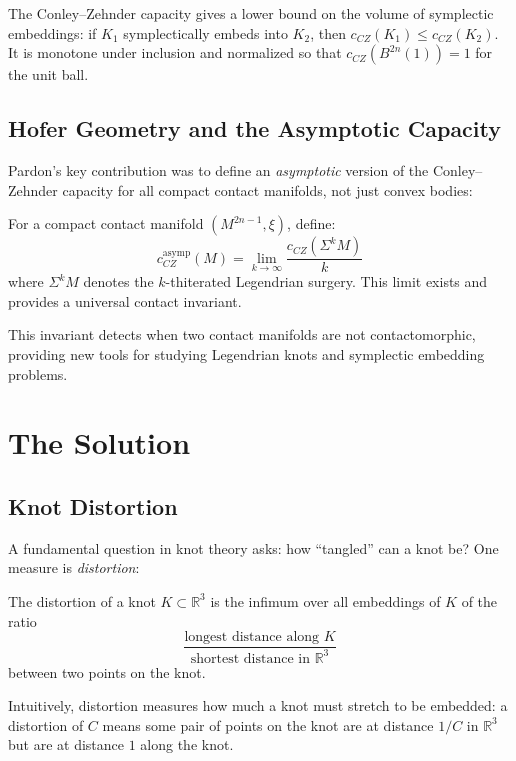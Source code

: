 The Conley--Zehnder capacity gives a lower bound on the volume of symplectic embeddings: if $K_1$ symplectically embeds into $K_2$, then $c_{CZ}(K_1) \le c_{CZ}(K_2)$. It is monotone under inclusion and normalized so that $c_{CZ}(B^{2n}(1)) = 1$ for the unit ball.

\subsection{Hofer Geometry and the Asymptotic Capacity}

Pardon's key contribution was to define an \emph{asymptotic} version of the Conley--Zehnder capacity for all compact contact manifolds, not just convex bodies:

\begin{theorem}
For a compact contact manifold $(M^{2n-1}, \xi)$, define:
\[
c_{CZ}^{\text{asymp}}(M) = \lim_{k \to \infty} \frac{c_{CZ}(\Sigma^k M)}{k}
\]
where $\Sigma^k M$ denotes the $k$-thiterated Legendrian surgery. This limit exists and provides a universal contact invariant.
\end{theorem}

This invariant detects when two contact manifolds are not contactomorphic, providing new tools for studying Legendrian knots and symplectic embedding problems.

\section{The Solution}

\subsection{Knot Distortion}

A fundamental question in knot theory asks: how ``tangled'' can a knot be? One measure is \emph{distortion}:

\begin{definition}
The distortion of a knot $K \subset \mathbb{R}^3$ is the infimum over all embeddings of $K$ of the ratio
\[
\frac{\text{longest distance along } K}{\text{shortest distance in } \mathbb{R}^3}
\]
between two points on the knot.
\end{definition}

Intuitively, distortion measures how much a knot must stretch to be embedded: a distortion of $C$ means some pair of points on the knot are at distance $1/C$ in $\mathbb{R}^3$ but are at distance $1$ along the knot.

